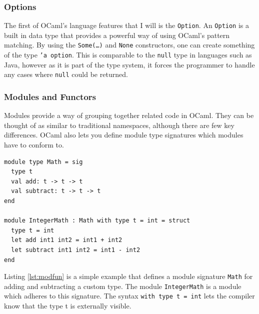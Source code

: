 \documentclass[12pt,a4paper,twoside,openright]{report}
\begin{document}
	\subsubsection*{Options}
	The first of OCaml's language features that I will is the \texttt{Option}.
	An \texttt{Option} is a built in data type that provides a powerful way of using OCaml's pattern matching.
	By using the \texttt{Some(\ldots)} and \texttt{None} constructors, one can create something of the type \texttt{'a option}. 
	This is comparable to the \texttt{null} type in languages such as Java, however as it is part of the type system, it forces the programmer to handle any cases where \texttt{null} could be returned. 

	\subsubsection*{Modules and Functors}
	Modules provide a way of grouping together related code in OCaml.
	They can be thought of as similar to traditional namespaces, although there are few key differences.
	OCaml also lets you define module type signatures which modules have to conform to.\\
	\begin{lstlisting}[caption={OCaml Modules and Functors},label={lst:modfun}]
module type Math = sig
  type t
  val add: t -> t -> t
  val subtract: t -> t -> t
end

module IntegerMath : Math with type t = int = struct 
  type t = int
  let add int1 int2 = int1 + int2
  let subtract int1 int2 = int1 - int2
end
	\end{lstlisting}
	\noindent Listing \ref{lst:modfun} is a simple example that defines a module signature \texttt{Math} for adding and subtracting a custom type.
	The module \texttt{IntegerMath} is a module which adheres to this signature. 
	The syntax \texttt{with type t = int} lets the compiler know that the type t is externally visible.\\
\end{document}
